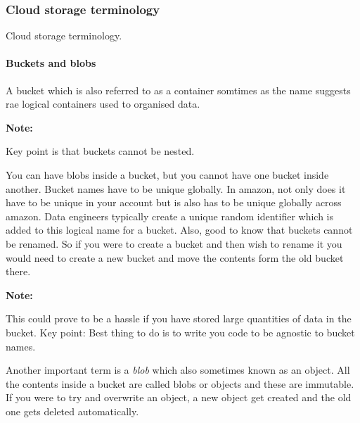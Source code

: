 \documentclass[a4paper, 11pt]{book}
\newenvironment{note}{
    \begin{siderule}
        \textbf{Note: }
        }{
    \end{siderule}}
\begin{document}
    \subsubsection{Cloud storage terminology}
    Cloud storage terminology.

    \paragraph{Buckets and blobs}
    A bucket which is also referred to as a container somtimes as the name suggests rae logical containers used to organised data.

    \begin{note}
        Key point is that buckets cannot be nested.
    \end{note}

    You can have blobs inside a bucket, but you cannot have one bucket inside another.
    Bucket names have to be unique globally.
    In amazon, not only does it have to be unique in your account but is also has to be unique globally across amazon.
    Data engineers typically create a unique random identifier which is added to this logical name for a bucket.
    Also, good to know that buckets cannot be renamed.
    So if you were to create a bucket and then wish to rename it you would need to create a new bucket and move the contents form the old bucket there.

    \begin{note}
        This could prove to be a hassle if you have stored large quantities of data in the bucket.
        Key point: Best thing to do is to write you code to be agnostic to bucket names.
    \end{note}

    Another important term is a \textit{blob} which also sometimes known as an object.
    All the contents inside a bucket are called blobs or objects and these are immutable.
    If you were to try and overwrite an object, a new object get created and the old one gets deleted automatically.
\end{document}
